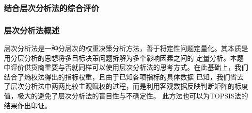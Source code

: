 \documentclass{cumcmthesis}
\begin{document}
\subsubsection{结合层次分析法的综合评价}

\subsubsection*{层次分析法概述}
层次分析法是一种分层次的权重决策分析方法，善于将定性问题定量化。其本质是用分层分析的思想将多目标决策问题拆解为多个影响因素之间的
定量分析。本题中评价供货商重要与否就同样可以使用层次分析法的思考方式。在此基础上，我们结合了熵权法得出的指标权重，且由于已知各项指标的具体数据
已知，我们省去了层次分析法中两两比较主观赋权的过程，而是利用客观数据反映判断矩阵的标度值，极大的避免了层次分析法的盲目性与不确定性。
此方法也可以为TOPSIS法的结果作出印证。
\end{document}

